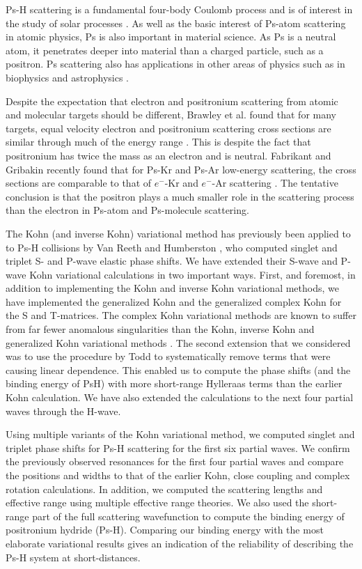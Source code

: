 \documentclass[preprint,showpacs,preprintnumbers,amsmath,amssymb]{revtex4}
\begin{document}
Ps-H scattering is a fundamental four-body Coulomb process
and is of interest in the study of solar processes \cite{Laricchia2012, ?}.
As well as the basic interest of Ps-atom scattering in atomic physics,
Ps is also important in material science.
As Ps is a neutral atom, it penetrates deeper into material than a charged particle,
such as a positron.
Ps scattering also has applications
in other areas of physics such as in biophysics and astrophysics \cite{Laricchia2012, ?}.

Despite the expectation that electron and positronium scattering from atomic and molecular targets should be different, Brawley et al. found that for many targets, equal velocity electron and positronium scattering cross sections are similar through much of the energy range \cite{Brawley2010a,Brawley2010}. This is despite the fact that positronium has twice the mass as an electron and is neutral. Fabrikant and Gribakin recently found that for Ps-Kr and Ps-Ar low-energy scattering, the cross sections are comparable to that of $e^-$-Kr and $e^-$-Ar scattering \cite{Fabrikant2014,Fabrikant2014a}. The tentative conclusion is that the positron plays a much smaller role in the scattering process than the electron in Ps-atom and Ps-molecule scattering.

The Kohn (and inverse Kohn) variational method has previously been applied to
to Ps-H collisions by 
Van Reeth and Humberston \cite{VanReeth2003,VanReeth2004}, who computed singlet and triplet
S- and P-wave elastic phase shifts. 
We have extended their S-wave and P-wave Kohn variational calculations in two important ways.
First, and foremost, in addition to implementing
the Kohn and inverse Kohn variational methods, we have
implemented the generalized Kohn and the generalized complex Kohn
for the S and T-matrices. 
The complex Kohn variational methods are known to suffer
from far fewer anomalous singularities than the
Kohn, inverse Kohn and generalized Kohn variational methods \cite{Lucchese1989, Cooper2010}. 
The second extension that we considered was to use
the procedure by Todd to systematically remove terms that
were causing linear dependence.
This enabled us to compute the phase shifts (and the binding
energy of PsH) with more short-range Hylleraas terms than the earlier 
Kohn calculation. 
We have also extended the calculations to the next four partial waves through the H-wave.

Using multiple variants of the Kohn variational method, we computed singlet and triplet phase shifts for Ps-H scattering for the first six partial waves. We confirm the previously observed resonances for the first four partial waves and compare the positions and widths to that of the earlier Kohn, close coupling and complex rotation calculations. In addition, we computed the scattering lengths and effective range using multiple effective range theories. We also used the short-range part of the full scattering wavefunction to compute the binding energy of positronium hydride (Ps-H). Comparing our binding energy with the most elaborate variational results gives an indication of the reliability of describing the Ps-H system at short-distances. 
\end{document}
